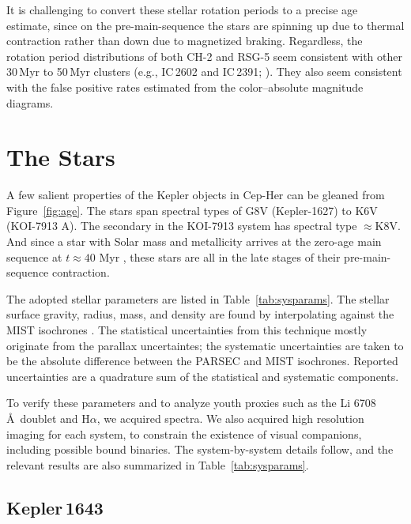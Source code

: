 \documentclass[12pt,twocolumn]{aastex63}
\begin{document}
It is challenging to convert these stellar rotation periods to a
precise age estimate, since on the pre-main-sequence the stars are
spinning up due to thermal contraction rather than down due to
magnetized braking.  Regardless, the rotation period distributions of
both CH-2 and RSG-5 seem consistent with other 30\,Myr to 50\,Myr
clusters ({e.g.}, IC\,2602 and IC\,2391;
\citealt{douglas_stephanie_t_2021_5131306}).  They also seem
consistent with the false positive rates estimated from the
color--absolute magnitude diagrams.


\section{The Stars}
\label{sec:stars}



A few salient properties of the Kepler objects in Cep-Her can be
gleaned from Figure~\ref{fig:age}.  The stars span spectral types of
G8V (Kepler-1627) to K6V (KOI-7913 A).  The secondary in the KOI-7913
system has spectral type $\approx$K8V.  And since a star with
Solar mass and metallicity arrives at the zero-age main sequence at
$t\approx40$ Myr \citep{choi_mesa_2016}, these stars are all in the
late stages of their pre-main-sequence contraction.  

The adopted stellar parameters are listed in
Table~\ref{tab:sysparams}.  The stellar surface gravity, radius, mass,
and density are found by interpolating against the MIST isochrones
\citep{choi_mesa_2016}.  The statistical uncertainties from this
technique mostly originate from the parallax uncertaintes; the
systematic uncertainties are taken to be the absolute difference
between the PARSEC \citep{bressan_parsec_2012} and MIST isochrones.
Reported uncertainties are a quadrature sum of the statistical and
systematic components. 

To verify these parameters and to analyze youth
proxies such as the Li 6708\,\AA\ doublet and H$\alpha$, we acquired
spectra.  We also acquired high resolution imaging for each system, to
constrain the existence of visual companions, including possible bound
binaries.  The system-by-system details follow, and the relevant
results are also summarized in Table~\ref{tab:sysparams}.

\subsection{Kepler\,1643}
\end{document}
